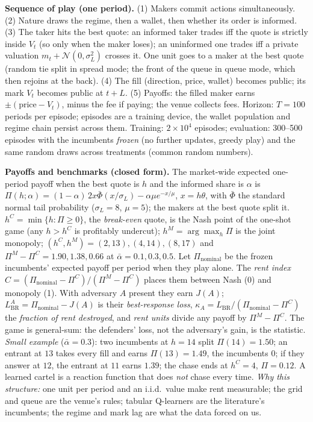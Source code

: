 \documentclass[10pt]{article}
\newcommand{\LBR}{L_{\mathrm{BR}}}
\begin{document}
\textbf{Sequence of play (one period).} (1) Makers commit actions simultaneously. (2) Nature draws the regime, then a wallet, then whether its order is informed. (3) The taker hits the best quote: an informed taker trades iff the quote is strictly inside $V_t$ (so only when the maker loses); an uninformed one trades iff a private valuation $m_t+\mathcal{N}(0,\sigma_L^2)$ crosses it. One unit goes to a maker at the best quote (random tie split in spread mode; the front of the queue in queue mode, which then rejoins at the back). (4) The fill (direction, price, wallet) becomes public; its mark $V_t$ becomes public at $t+L$. (5) Payoffs: the filled maker earns $\pm(\text{price}-V_t)$, minus the fee if paying; the venue collects fees. Horizon: $T=100$ periods per episode; episodes are a training device, the wallet population and regime chain persist across them. Training: $2\times10^4$ episodes; evaluation: 300--500 episodes with the incumbents \emph{frozen} (no further updates, greedy play) and the same random draws across treatments (common random numbers).

\textbf{Payoffs and benchmarks (closed form).} The market-wide expected one-period payoff when the best quote is $h$ and the informed share is $\alpha$ is $\Pi(h;\alpha)=(1-\alpha)\,2x\bar\Phi(x/\sigma_L)-\alpha\mu e^{-x/\mu}$, $x=h\theta$, with $\bar\Phi$ the standard normal tail probability ($\sigma_L=8$, $\mu=5$); the makers at the best quote split it. $h^C=\min\{h:\Pi\ge0\}$, the \emph{break-even} quote, is the Nash point of the one-shot game (any $h>h^C$ is profitably undercut); $h^M=\arg\max_h\Pi$ is the joint monopoly; $(h^C,h^M)=(2,13),(4,14),(8,17)$ and $\Pi^M-\Pi^C=1.90,1.38,0.66$ at $\bar\alpha=0.1,0.3,0.5$. Let $\Pi_{\mathrm{nominal}}$ be the frozen incumbents' expected payoff per period when they play alone. The \emph{rent index} $C=(\Pi_{\mathrm{nominal}}-\Pi^C)/(\Pi^M-\Pi^C)$ places them between Nash (0) and monopoly (1). With adversary $A$ present they earn $J(A)$; $\LBR^A=\Pi_{\mathrm{nominal}}-J(A)$ is their \emph{best-response loss}, $\kappa_A=\LBR/(\Pi_{\mathrm{nominal}}-\Pi^C)$ the \emph{fraction of rent destroyed}, and \emph{rent units} divide any payoff by $\Pi^M-\Pi^C$. The game is general-sum: the defenders' loss, not the adversary's gain, is the statistic. \emph{Small example} ($\bar\alpha=0.3$): two incumbents at $h=14$ split $\Pi(14)=1.50$; an entrant at $13$ takes every fill and earns $\Pi(13)=1.49$, the incumbents 0; if they answer at $12$, the entrant at $11$ earns $1.39$; the chase ends at $h^C=4$, $\Pi=0.12$. A learned cartel is a reaction function that does \emph{not} chase every time. \emph{Why this structure:} one unit per period and an i.i.d.\ value make rent measurable; the grid and queue are the venue's rules; tabular Q-learners are the literature's incumbents; the regime and mark lag are what the data forced on us.
\end{document}
